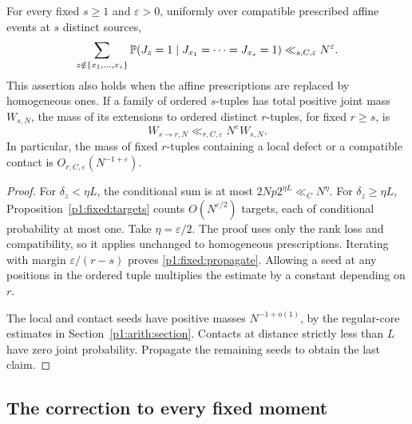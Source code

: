 \begin{proposition}
\label{p1:fixed:propagation}
For every fixed \(s\ge1\) and \(\varepsilon>0\), uniformly
over compatible prescribed affine events at \(s\) distinct
sources,
\begin{equation}
 \sum_{z\notin\{x_1,\ldots,x_s\}}
 \P(J_z=1\mid J_{x_1}=\cdots=J_{x_s}=1)
       \ll_{s,C,\varepsilon}N^\varepsilon .
 \label{p1:fixed:conditional}
\end{equation}
This assertion also holds when the affine prescriptions
are replaced by homogeneous ones. If a family of ordered
\(s\)-tuples has total positive joint mass \(W_{s,N}\),
the mass of its extensions to ordered distinct \(r\)-tuples,
for fixed \(r\ge s\), is
\begin{equation}
 W_{s\to r,N}\ll_{r,C,\varepsilon}N^\varepsilon W_{s,N}.
 \label{p1:fixed:propagate}
\end{equation}
In particular, the mass of fixed \(r\)-tuples containing
a local defect or a compatible contact is
\(O_{r,C,\varepsilon}(N^{-1+\varepsilon})\).
\end{proposition}

\begin{proof}
For \(\delta_z<\eta L\), the conditional sum is at most
\(2Np2^{\eta L}\ll_C N^\eta\). For
\(\delta_z\ge\eta L\), Proposition~\ref{p1:fixed:targets}
counts \(O(N^{\varepsilon/2})\) targets, each of conditional
probability at most one. Take \(\eta=\varepsilon/2\).
The proof uses only the rank loss and compatibility, so
it applies unchanged to homogeneous prescriptions.
Iterating with margin \(\varepsilon/(r-s)\) proves
\eqref{p1:fixed:propagate}. Allowing a seed at any positions
in the ordered tuple multiplies the estimate by a constant
depending on \(r\).

The local and contact seeds have positive masses
\(N^{-1+o(1)}\), by the regular-core estimates in
Section~\ref{p1:arith:section}. Contacts at distance
strictly less than \(L\) have zero joint probability.
Propagate the remaining seeds to obtain the last claim.
\end{proof}

\subsection{The correction to every fixed moment}

